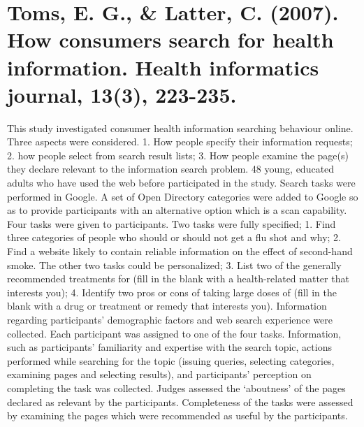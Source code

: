 \documentclass[]{article}
\begin{document}
\section{Toms, E. G., \& Latter, C. (2007). How consumers search for health information. Health informatics journal, 13(3), 223-235.}

This study investigated consumer health information searching behaviour online. Three aspects were considered. 1. How people specify their information requests; 2. how people select from search result lists; 3. How people examine the page(s) they declare relevant to the information search problem. 48 young, educated adults who have used the web before participated in the study. Search tasks were performed in Google. A set of Open Directory categories were added to Google so as to provide participants with an alternative option which is a scan capability. Four tasks were given to participants. Two tasks were fully specified; 1. Find three categories of people who should or should not get a flu shot and why; 2. Find a website likely to contain reliable information on the effect of second-hand smoke. The other two tasks could be personalized; 3. List two of the generally recommended treatments for (fill in the blank with a health-related matter that interests you); 4. Identify two pros or cons of taking large doses of (fill in the blank with a drug or treatment or remedy that interests you). Information regarding participants' demographic factors and web search experience were collected. Each participant was assigned to one of the four tasks. Information, such as participants' familiarity and expertise with the search topic, actions performed while searching for the topic (issuing queries, selecting categories, examining pages and selecting results), and participants' perception on completing the task was collected. Judges assessed the ‘aboutness’ of the pages declared as relevant by the participants. Completeness of the tasks were assessed by examining the pages which were recommended as useful by the participants.
\end{document}

